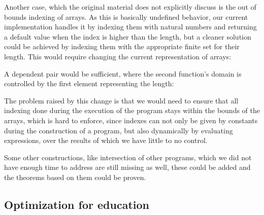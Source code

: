 Another case, which the original material does not explicitly discuss is the out of bounds indexing of arrays. As this is basically undefined behavior, our current implementation handles it by indexing them with natural numbers and returning a default value when the index is higher than the length, but a cleaner solution could be achieved by indexing them with the appropriate finite set for their length. This would require changing the current representation of arrays:
\begin{code}
    \>[0]\AgdaSpace{}%
    \AgdaSymbol{(}\AgdaSpace{}%
    \AgdaSymbol{)}\AgdaSpace{}%
    \AgdaSymbol{=}\AgdaSpace{}%
    \AgdaSpace{}%
    \AgdaSpace{}%
    \AgdaSymbol{(}\AgdaSpace{}%
    \AgdaSpace{}%
    \AgdaSymbol{(}\AgdaSpace{}%
    \AgdaSymbol{))}\<%
\end{code}

A dependent pair would be sufficient, where the second function's domain is controlled by the first element representing the length:
\begin{code}
    \>[0]\AgdaSpace{}%
    \AgdaSymbol{(}\AgdaSpace{}%
    \AgdaSymbol{)}\AgdaSpace{}%
    \AgdaSymbol{=}\AgdaSpace{}%
    \AgdaSpace{}%
    \AgdaSpace{}%
    \AgdaSpace{}%
    \AgdaSpace{}%
    \AgdaSpace{}%
    \AgdaSymbol{(}\AgdaSpace{}%
    \AgdaSpace{}%
    \AgdaSpace{}%
    \AgdaSymbol{(}\AgdaSpace{}%
    \AgdaSymbol{)))}\<%
\end{code}

The problem raised by this change is that we would need to ensure that all indexing done during the execution of the program stays within the bounds of the arrays, which is hard to enforce, since indexes can not only be given by constants during the construction of a program, but also dynamically by evaluating expressions, over the results of which we have little to no control.

Some other constructions, like intersection of other programs, which we did not have enough time to address are still missing as well, these could be added and the theorems based on them could be proven.

\subsection{Optimization for education}

